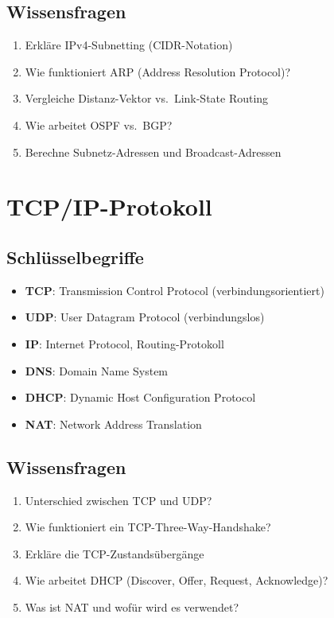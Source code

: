 \documentclass[12pt,a4paper,german]{report}
\begin{document}
\section{Wissensfragen}
\begin{enumerate}
    \item Erkläre IPv4-Subnetting (CIDR-Notation)
    \item Wie funktioniert ARP (Address Resolution Protocol)?
    \item Vergleiche Distanz-Vektor vs.\ Link-State Routing
    \item Wie arbeitet OSPF vs.\ BGP?
    \item Berechne Subnetz-Adressen und Broadcast-Adressen
\end{enumerate}

\chapter{TCP/IP-Protokoll}

\section{Schlüsselbegriffe}
\begin{itemize}
    \item \textbf{TCP}: Transmission Control Protocol (verbindungsorientiert)
    \item \textbf{UDP}: User Datagram Protocol (verbindungslos)
    \item \textbf{IP}: Internet Protocol, Routing-Protokoll
    \item \textbf{DNS}: Domain Name System
    \item \textbf{DHCP}: Dynamic Host Configuration Protocol
    \item \textbf{NAT}: Network Address Translation
\end{itemize}

\section{Wissensfragen}
\begin{enumerate}
    \item Unterschied zwischen TCP und UDP?
    \item Wie funktioniert ein TCP-Three-Way-Handshake?
    \item Erkläre die TCP-Zustandsübergänge
    \item Wie arbeitet DHCP (Discover, Offer, Request, Acknowledge)?
    \item Was ist NAT und wofür wird es verwendet?
\end{enumerate}
\end{document}
